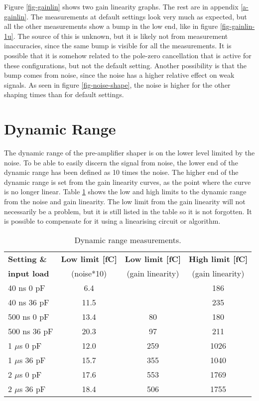 \documentclass[../main/thesis.tex]{subfiles}
\begin{document}
Figure \ref{fig-gainlin} shows two gain linearity graphs. The rest are in appendix \ref{a-gainlin}. The measurements at default settings look very much as expected, but all the other measurements show a bump in the low end, like in figure \ref{fig-gainlin-1u}. The source of this is unknown, but it is likely not from measurement inaccuracies, since the same bump is visible for all the measurements. It is possible that it is somehow related to the pole-zero cancellation that is active for these configurations, but not the default setting. Another possibility is that the bump comes from noise, since the noise has a higher relative effect on weak signals. As seen in figure \ref{fig-noise-shape}, the noise is higher for the other shaping times than for default settings. 

\section{Dynamic Range}
\label{ide-dynamicrange}
The dynamic range of the pre-amplifier shaper is on the lower level limited by the noise. To be able to easily discern the signal from noise, the lower end of the dynamic range has been defined as 10 times the noise. The higher end of the dynamic range is set from the gain linearity curves, as the point where the curve is no longer linear. Table \ref{tab-dynrange} shows the low and high limits to the dynamic range from the noise and gain linearity. The low limit from the gain linearity will not necessarily be a problem, but it is still listed in the table so it is not forgotten. It is possible to compensate for it using a linearising circuit or algorithm. 

\begin{table}[h!]
	\begin{center}
		\caption{Dynamic range measurements.}
		\label{tab-dynrange}
		\begin{tabular}{lccc}\toprule
			\textbf{Setting \&}     & \textbf{Low limit [fC]} & \textbf{Low limit [fC]}      & \textbf{High limit [fC]}     \\
			\textbf{input load}    & (noise*10) & (gain linearity) & (gain linearity) \\ \midrule
			40 ns 0 pF     & 6.4     &                & 186            \\
			40 ns 36 pF    & 11.5     &                & 235            \\
			500 ns 0 pF    & 13.4     & 80             & 180            \\
			500 ns 36 pF   & 20.3    & 97             & 211            \\
			1 $\mu$s 0 pF  & 12.0    & 259            & 1026           \\
			1 $\mu$s 36 pF & 15.7     & 355            & 1040           \\
			2 $\mu$s 0 pF  & 17.6    & 553            & 1769           \\
			2 $\mu$s 36 pF & 18.4    & 506            & 1755    \\ \bottomrule
		\end{tabular}
	\end{center}
\end{table}
\end{document}
